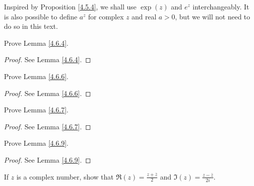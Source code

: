\begin{note}
    Inspired by Proposition \ref{4.5.4}, we shall use \(\exp(z)\) and \(e^z\) interchangeably.
    It is also possible to define \(a^z\) for complex \(z\) and real \(a > 0\), but we will not need to do so in this text.
\end{note}

\exercisesection

\begin{exercise}\label{ex 4.6.1}
    Prove Lemma \ref{4.6.4}.
\end{exercise}

\begin{proof}
    See Lemma \ref{4.6.4}.
\end{proof}

\begin{exercise}\label{ex 4.6.2}
    Prove Lemma \ref{4.6.6}.
\end{exercise}

\begin{proof}
    See Lemma \ref{4.6.6}.
\end{proof}

\begin{exercise}\label{ex 4.6.3}
    Prove Lemma \ref{4.6.7}.
\end{exercise}

\begin{proof}
    See Lemma \ref{4.6.7}.
\end{proof}

\begin{exercise}\label{ex 4.6.4}
    Prove Lemma \ref{4.6.9}.
\end{exercise}

\begin{proof}
    See Lemma \ref{4.6.9}.
\end{proof}

\begin{exercise}\label{ex 4.6.5}
    If \(z\) is a complex number, show that \(\Re(z) = \frac{z + \overline{z}}{2}\) and \(\Im(z) = \frac{z - \overline{z}}{2i}\).
\end{exercise}

